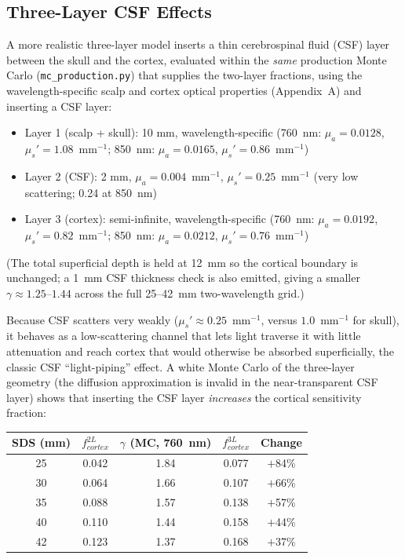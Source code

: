 \documentclass[12pt]{article}
\def\text#1{#1}%
\begin{document}
\subsection{Three-Layer CSF Effects}

A more realistic three-layer model inserts a thin cerebrospinal fluid (CSF) layer between the skull and the cortex, evaluated within the \emph{same} production Monte Carlo (\texttt{mc\_production.py}) that supplies the two-layer fractions, using the wavelength-specific scalp and cortex optical properties (Appendix~A) and inserting a CSF layer:
\begin{itemize}
\item Layer 1 (scalp + skull): 10 mm, wavelength-specific (760~nm: $\mu_a = 0.0128$, $\mu_s' = 1.08$~mm$^{-1}$; 850~nm: $\mu_a = 0.0165$, $\mu_s' = 0.86$~mm$^{-1}$)
\item Layer 2 (CSF): 2 mm, $\mu_a = 0.004$~mm$^{-1}$, $\mu_s' = 0.25$~mm$^{-1}$ (very low scattering; 0.24 at 850~nm)
\item Layer 3 (cortex): semi-infinite, wavelength-specific (760~nm: $\mu_a = 0.0192$, $\mu_s' = 0.82$~mm$^{-1}$; 850~nm: $\mu_a = 0.0212$, $\mu_s' = 0.76$~mm$^{-1}$)
\end{itemize}
(The total superficial depth is held at 12~mm so the cortical boundary is unchanged; a 1~mm CSF thickness check is also emitted, giving a smaller $\gamma\approx1.25$--$1.44$ across the full 25--42~mm two-wavelength grid.)

Because CSF scatters very weakly ($\mu_s' \approx 0.25$~mm$^{-1}$, versus $1.0$~mm$^{-1}$ for skull), it behaves as a low-scattering channel that lets light traverse it with little attenuation and reach cortex that would otherwise be absorbed superficially, the classic CSF ``light-piping'' effect. A white Monte Carlo of the three-layer geometry (the diffusion approximation is invalid in the near-transparent CSF layer) shows that inserting the CSF layer \emph{increases} the cortical sensitivity fraction:

\begin{center}
\begin{tabular}{ccccc}
\hline
\textbf{SDS (mm)} & $f_{\text{cortex}}^{\text{2L}}$ & $\gamma$ (MC, 760~nm) & $f_{\text{cortex}}^{\text{3L}}$ & Change \\
\hline
25 & 0.042 & 1.84 & 0.077 & $+$84\% \\
30 & 0.064 & 1.66 & 0.107 & $+$66\% \\
35 & 0.088 & 1.57 & 0.138 & $+$57\% \\
40 & 0.110 & 1.44 & 0.158 & $+$44\% \\
42 & 0.123 & 1.37 & 0.168 & $+$37\% \\
\hline
\end{tabular}
\end{center}
\end{document}
